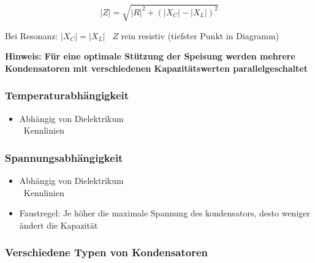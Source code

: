 \begin{minipage}[c]{0.48\columnwidth}
    $$ \boxed{ |Z| = \sqrt{|R|^2 + (|X_{C}| - |X_L|)^2 } } $$
\end{minipage}
\hfill
\begin{minipage}[c]{0.48\columnwidth}
    Bei Resonanz: $ |X_C| = |X_L|$ \textrightarrow\ $Z$ rein resistiv (tiefster Punkt in Diagramm)
\end{minipage}

\vspace{0.2cm}
\textbf{Hinweis: Für eine optimale Stützung der Speisung werden mehrere Kondensatoren mit verschiedenen Kapazitätswerten parallelgeschaltet}


\begin{minipage}[t]{0.48\columnwidth}
    \subsubsection{Temperaturabhängigkeit}

    \begin{itemize}
        \item Abhängig von Dielektrikum \\
            \textrightarrow\ Kennlinien
    \end{itemize}
\end{minipage}
\hfill
\begin{minipage}[t]{0.48\columnwidth}
    \subsubsection{Spannungsabhängigkeit}

    \begin{itemize}
        \item Abhängig von Dielektrikum \\
            \textrightarrow\ Kennlinien
        \item Faustregel: Je höher die maximale Spannung des kondensators, desto weniger ändert 
            die Kapazität
    \end{itemize}
\end{minipage}


\subsubsection{Verschiedene Typen von Kondensatoren}

